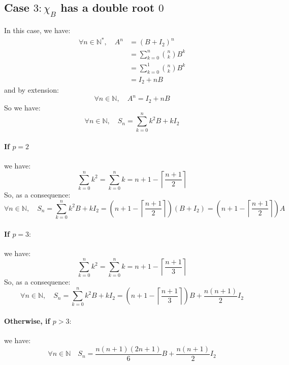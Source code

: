 \documentclass[]{article}
\begin{document}
\subsection{Case $3: \chi_B$ has a double root $0$}
In this case, we have:
\begin{align*}
\forall n \in\mathbb{N}^*,\quad A^n&=(B+I_2)^n\\
&=\sum_{k=0}^n {n \choose k} B^k \\
&=\sum_{k=0}^1 {n \choose k} B^k \\
&=I_2 + nB
\end{align*}
and by extension: 
$$
\forall n\in\mathbb{N}, \quad A^n=I_2+nB
$$
So we have:
$$
\boxed{\forall n\in\mathbb{N},\quad S_n = \sum_{k=0}^nk^2B+kI_2}
$$
\paragraph{If $p=2$}
we have:
$$
\sum_{k=0}^n k^2=\sum_{k=0}^nk=n+1-\left\lceil \frac{n+1}{2}\right\rceil
$$
So, as a consequence:
$$
\boxed{\forall n\in\mathbb{N},\quad S_n=\sum_{k=0}^nk^2B+kI_2=\left(n+1-\left\lceil \frac{n+1}{2}\right\rceil\right)(B+I_2)=\left(n+1-\left\lceil \frac{n+1}{2}\right\rceil\right)A}
$$

\paragraph{If $p=3:$}
we have:
$$
\sum_{k=0}^n k^2=\sum_{k=0}^nk=n+1-\left\lceil \frac{n+1}{3}\right\rceil
$$
So, as a consequence:
$$
\boxed{\forall n\in\mathbb{N},\quad S_n=\sum_{k=0}^nk^2B+kI_2=\left(n+1-\left\lceil \frac{n+1}{3}\right\rceil\right)B+\frac{n(n+1)}{2}I_2}
$$

\paragraph{Otherwise, if $p>3:$} we have:
$$
\boxed{\forall n\in\mathbb{N}\quad S_n=\frac{n(n+1)(2n+1)}{6}B+\frac{n(n+1)}{2}I_2}
$$
\pagebreak
\end{document}
